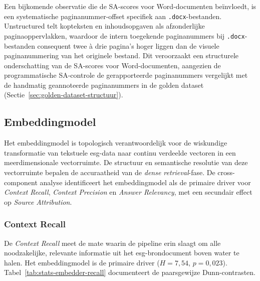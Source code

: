 Een bijkomende observatie die de SA-scores voor Word-documenten beïnvloedt, is een systematische paginanummer-offset specifiek aan \texttt{.docx}-bestanden. Unstructured telt kopteksten en inhoudsopgaven als afzonderlijke paginaoppervlakken, waardoor de intern toegekende paginanummers bij \texttt{.docx}-bestanden consequent twee à drie pagina's hoger liggen dan de visuele paginanummering van het originele bestand. Dit veroorzaakt een structurele onderschatting van de SA-scores voor Word-documenten, aangezien de programmatische SA-controle de gerapporteerde paginanummers vergelijkt met de handmatig geannoteerde paginanummers in de golden dataset (Sectie~\ref{sec:golden-dataset-structuur}).

\subsection{Embeddingmodel}
\label{subsec:embedding-prestaties}

Het embeddingmodel is topologisch verantwoordelijk voor de wiskundige transformatie van tekstuele \gls{esg}-data naar continu verdeelde vectoren in een meerdimensionale vectorruimte. De structuur en semantische resolutie van deze vectorruimte bepalen de accuraatheid van de \textit{dense retrieval}-fase. De cross-component analyse identificeert het embeddingmodel als de primaire driver voor \textit{Context Recall}, \textit{Context Precision} en \textit{Answer Relevancy}, met een secundair effect op \textit{Source Attribution}.

\subsubsection{Context Recall}

De \textit{Context Recall} meet de mate waarin de pipeline erin slaagt om alle noodzakelijke, relevante informatie uit het \gls{esg}-brondocument boven water te halen. Het embeddingmodel is de primaire driver ($H = 7{,}54$, $p = 0{,}023$). Tabel~\ref{tab:stats-embedder-recall} documenteert de paarsgewijze Dunn-contrasten.

